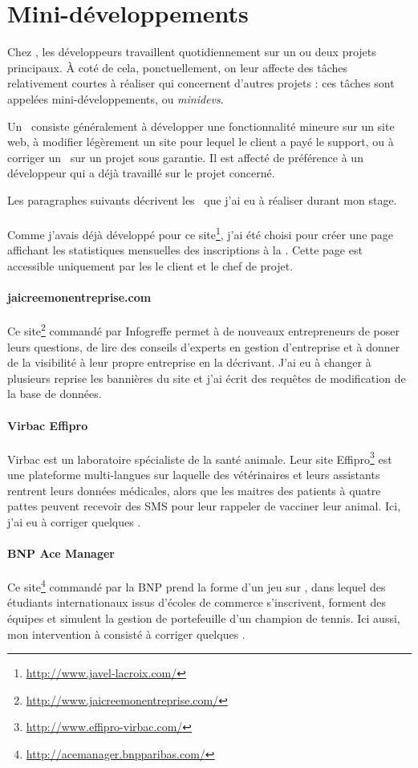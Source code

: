 \section{Mini-développements}
\label{minidev}

Chez \asl, les développeurs travaillent quotidiennement sur un ou deux projets principaux. À coté de cela, ponctuellement, on leur affecte des tâches relativement courtes à réaliser qui concernent d'autres projets : ces tâches sont appelées mini-développements, ou \emph{minidevs}.

Un \aminidev\ consiste généralement à développer une fonctionnalité mineure sur un site web, à modifier légèrement un site pour lequel le client a payé le support, ou à corriger un \abug\ sur un projet sous garantie. Il est affecté de préférence à un développeur qui a déjà travaillé sur le projet concerné. 

Les paragraphes suivants décrivent les \aminidevs\ que j'ai eu à réaliser durant mon stage.

\paragraph{\alc} Comme j'avais déjà développé pour ce site\footnote{\url{http://www.javel-lacroix.com/}}, j'ai été choisi pour créer une page affichant les statistiques mensuelles des inscriptions à la \anewsletter. Cette page est accessible uniquement par les le client et le chef de projet.

\paragraph{jaicreemonentreprise.com} Ce site\footnote{\url{http://www.jaicreemonentreprise.com/}} commandé par Infogreffe permet à de nouveaux entrepreneurs de poser leurs questions, de lire des conseils d'experts en gestion d'entreprise et à donner de la visibilité à leur propre entreprise en la décrivant. J'ai eu à changer à plusieurs reprise les bannières du site et j'ai écrit des requêtes de modification de la base de données.

\paragraph{Virbac Effipro} Virbac est un laboratoire spécialiste de la santé animale. Leur site Effipro\footnote{\url{http://www.effipro-virbac.com/}} est une plateforme multi-langues sur laquelle des vétérinaires et leurs assistants rentrent leurs données médicales, alors que les maitres des patients à quatre pattes peuvent recevoir des SMS pour leur rappeler de vacciner leur animal. Ici, j'ai eu à corriger quelques \abugs.

\paragraph{BNP Ace Manager} Ce site\footnote{\url{http://acemanager.bnpparibas.com/}} commandé par la BNP prend la forme d'un jeu sur \ainternet, dans lequel des étudiants internationaux issus d'écoles de commerce s'inscrivent, forment des équipes et simulent la gestion de portefeuille d'un champion de tennis. Ici aussi, mon intervention à consisté à corriger quelques \abugs.
